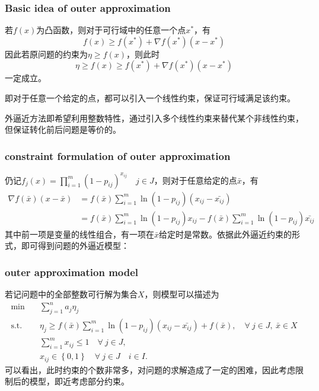 \documentclass[10pt]{beamer}
\begin{document}
\begin{frame}
    \frametitle{Basic idea of outer approximation}
    若$f(x)$为凸函数，则对于可行域中的任意一个点$x^*$，有
    \begin{equation*}
        f(x) \geq f(x^*) + \nabla f(x^*)(x - x^*)
    \end{equation*}
    因此若原问题的约束为$\eta \geq f(x)$，则此时
    \begin{equation*}
        \eta \geq f(x) \geq f(x^*) + \nabla f(x^*)(x - x^*)
    \end{equation*}
    一定成立。

    即对于任意一个给定的点，都可以引入一个线性约束，保证可行域满足该约束。

    外逼近方法即希望利用整数特性，通过引入多个线性约束来替代某个非线性约束，但保证转化前后问题是等价的。
\end{frame}

\begin{frame}
    \frametitle{constraint formulation of outer approximation}
    仍记$f_j(x) =  \prod_{i=1}^m (1 -  p_{ij})^{x_{ij}}\quad j \in J$，则对于任意给定的点$\bar{x}$，有
    \begin{align*}
        \nabla f(\bar{x})(x - \bar{x}) & = f(\bar{x})\sum_{i = 1}^m \ln(1-p_{ij})(x_{ij} - \bar{x_{ij}})\\
        &= f(\bar{x})\sum_{i = 1}^m \ln(1-p_{ij})x_{ij} - f(\bar{x})\sum_{i = 1}^m \ln(1-p_{ij})\bar{x_{ij}}
    \end{align*}
    其中前一项是变量的线性组合，有一项在$\bar{x}$给定时是常数。依据此外逼近约束的形式，即可得到问题的外逼近模型：
\end{frame}

\begin{frame}
    \frametitle{outer approximation model}
    若记问题中的全部整数可行解为集合$X$，则模型可以描述为
    {\scriptsize
    \begin{align}
        \min\quad & \sum_{j=1}^n a_j \eta_j \\ 
        \mathrm{s. t.}\quad & \eta_j \geq f(\bar{x})\sum_{i = 1}^m \ln(1-p_{ij})(x_{ij} - \bar{x_{ij}}) + f(\bar{x}), \quad \forall ~ j \in J,\ \bar{x} \in X \\ 
        &\sum_{i=1}^m x_{ij} \leq 1\quad \forall ~ j \in J,\\
        & x_{ij} \in \left\{ 0,1 \right\} \quad \forall ~ j\in J\quad i \in I.
    \end{align}
    }
    可以看出，此时约束的个数非常多，对问题的求解造成了一定的困难，因此考虑限制后的模型，即近考虑部分约束。
\end{frame}
\end{document}
